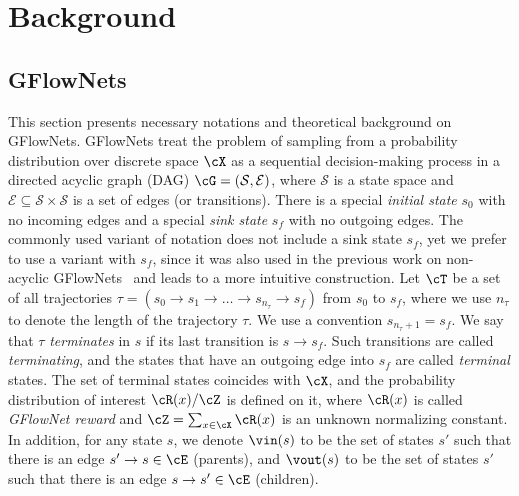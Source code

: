 
\section{Background}
\label{sec:background}
\subsection{GFlowNets}
\label{sec:background_gflow}


This section presents necessary notations and theoretical background on GFlowNets. GFlowNets treat the problem of sampling from a probability distribution over discrete space $\cX$ as a sequential decision-making process in a directed acyclic graph (DAG) \(\cG = (\mathcal{S}, \mathcal{E})\), where \(\mathcal{S}\) is a state space and \(\mathcal{E} \subseteq \mathcal{S} \times \mathcal{S}\) is a set of edges (or transitions). There is a special \textit{initial state} $s_0$ with no incoming edges and a special \textit{sink state} $s_f$ with no outgoing edges. The commonly used variant of notation does not include a sink state $s_f$, yet we prefer to use a variant with $s_f$, since it was also used in the previous work on non-acyclic GFlowNets~\cite{brunswic2024theory} and leads to a more intuitive construction. Let $\cT$ be a set of all trajectories $\tau = \left(s_0 \to s_1 \to \ldots \to s_{n_{\tau}} \to s_f\right)$ from $s_0$ to $s_f$, where we use $n_{\tau}$ to denote the length of the trajectory $\tau$. We use a convention $s_{n_{\tau} + 1} = s_f$. We say that $\tau$ \textit{terminates} in $s$ if its last transition is $s \to s_f$. Such transitions are called \textit{terminating}, and the states that have an outgoing edge into $s_f$ are called \textit{terminal} states. The set of terminal states coincides with $\cX$, and the probability distribution of interest $\cR(x) / \cZ$ is defined on it, where $\cR(x)$ is called \textit{GFlowNet reward} and $\cZ = \sum_{x \in \cX} \cR(x)$ is an unknown normalizing constant. In addition, for any state $s$, we denote $\vin(s)$ to be the set of states $s'$ such that there is an edge $s' \to s \in \cE$ (parents), and $\vout(s)$ to be the set of states $s'$ such that there is an edge $s \to s' \in \cE$ (children).

